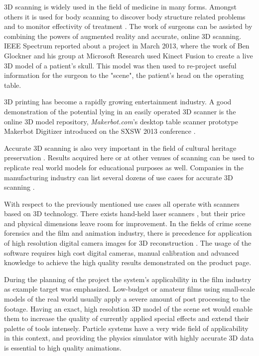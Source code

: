 \documentclass{ucl_thesis}
\begin{document}
3D scanning is widely used in the field of medicine in many forms. Amongst others it is used for body scanning to discover body structure related problems and to monitor effectivity of treatment \cite{photomodeler_biology}. The work of surgeons can be assisted by combining the powers of augmented reality and accurate, online 3D scanning. IEEE Spectrum \cite{Spectrum_IEEE} reported about a project in March 2013, where the work of Ben Glockner \cite{ben_glockner} and his group at Microsoft Research used Kinect Fusion \cite{Kinect_fusion} to create a live 3D model of a patient's skull. This model was then used to re-project useful information for the surgeon to the "scene", the patient's head on the operating table.
\par 3D printing has become a rapidly growing entertainment industry. A good demonstration of the potential lying in an easily operated 3D scanner is the online 3D model repository, {\it Makerbot.com}'s desktop table scanner prototype Makerbot Digitizer \cite{Digitizer} introduced on the SXSW 2013 conference \cite{SXSW}.
\par Accurate 3D scanning is also very important in the field of cultural heritage preservation \cite{Michelangelo_Project}. Results acquired here or at other venues of scanning can be used to replicate real world models for educational purposes as well. Companies in the manufacturing industry can list several dozens of use cases for accurate 3D scanning \cite{Creaform3D}. 
\par With respect to \cite{photomodeler_biology} the previously mentioned use cases all operate with scanners based on 3D technology. There exists hand-held laser scanners \cite{Creaform3D}, but their price and physical dimensions leave room for improvement. In the fields of crime scene forensics and the film and animation industry, there is precedence for application of high resolution digital camera images for 3D reconstruction \cite{Photomodeler_film} \cite{Photomodeler_forensics}. The usage of the software requires high cost digital cameras, manual calibration and advanced knowledge to achieve the high quality results demonstrated on the product page. 
\par During the planning of the project the system's applicability in the film industry as example target was emphasized. Low-budget or amateur films using small-scale models of the real world usually apply a severe amount of post processing to the footage. Having an exact, high resolution 3D model of the scene set would enable them to increase the quality of currently applied special effects and extend their palette of tools intensely. Particle systems have a very wide field of applicability in this context, and providing the physics simulator with highly accurate 3D data is essential to high quality animations.\\
\end{document}
